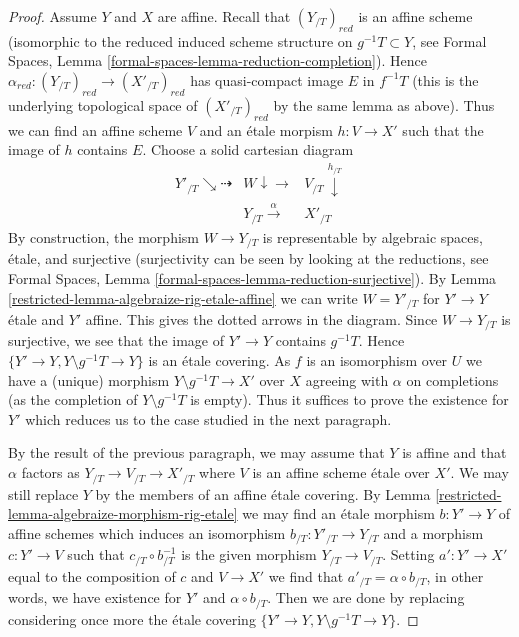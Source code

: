 \begin{proof}
\medskip\noindent
Assume $Y$ and $X$ are affine. Recall that $(Y_{/T})_{red}$
is an affine scheme (isomorphic to the reduced induced scheme structure
on $g^{-1}T \subset Y$, see Formal Spaces, Lemma
\ref{formal-spaces-lemma-reduction-completion}).
Hence $\alpha_{red} : (Y_{/T})_{red} \to (X'_{/T})_{red}$
has quasi-compact image $E$ in $f^{-1}T$ (this is the underlying
topological space of $(X'_{/T})_{red}$ by the same lemma as above).
Thus we can find an affine scheme $V$ and an \'etale morpism
$h : V \to X'$ such that the image of $h$ contains $E$.
Choose a solid cartesian diagram
$$
\begin{array}{ccc}Y'_{/T} \searrow\dashrightarrow & W \downarrow\longrightarrow & V_{/T} \overset{h_{/T}}{\downarrow} \\  & Y_{/T} \overset{\alpha}{\longrightarrow} & X'_{/T}\end{array}
$$
By construction, the morphism $W \to Y_{/T}$ is representable by
algebraic spaces, \'etale, and surjective
(surjectivity can be seen by looking at the reductions, see
Formal Spaces, Lemma
\ref{formal-spaces-lemma-reduction-surjective}).
By Lemma \ref{restricted-lemma-algebraize-rig-etale-affine}
we can write $W = Y'_{/T}$ for $Y' \to Y$ \'etale and $Y'$ affine.
This gives the dotted arrows in the diagram.
Since $W \to Y_{/T}$ is surjective, we see that
the image of $Y' \to Y$ contains $g^{-1}T$.
Hence $\{Y' \to Y, Y \setminus g^{-1}T \to Y\}$
is an \'etale covering. As $f$ is an isomorphism over $U$ we have a
(unique) morphism $Y \setminus g^{-1}T \to X'$ over $X$
agreeing with $\alpha$ on completions
(as the completion of $Y \setminus g^{-1}T$ is empty).
Thus it suffices to prove the existence for $Y'$
which reduces us to the case studied in the next paragraph.

\medskip\noindent
By the result of the previous paragraph, we may assume that $Y$ is affine
and that $\alpha$ factors as $Y_{/T} \to V_{/T} \to X'_{/T}$
where $V$ is an affine scheme \'etale over $X'$. We may still replace $Y$ by
the members of an affine \'etale covering.
By Lemma \ref{restricted-lemma-algebraize-morphism-rig-etale}
we may find an \'etale morphism $b : Y' \to Y$ of affine schemes
which induces an isomorphism $b_{/T} : Y'_{/T} \to Y_{/T}$
and a morphism $c : Y' \to V$ such that $c_{/T} \circ b_{/T}^{-1}$
is the given morphism $Y_{/T} \to V_{/T}$. Setting
$a' : Y' \to X'$ equal to the composition of $c$ and $V \to X'$
we find that $a'_{/T} = \alpha \circ b_{/T}$, in other words, we have
existence for $Y'$ and $\alpha \circ b_{/T}$.
Then we are done by replacing considering once more
the \'etale covering $\{Y' \to Y, Y \setminus g^{-1}T \to Y\}$.
\end{proof}

